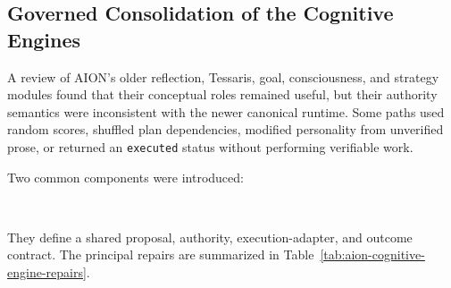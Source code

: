 \subsection{Governed Consolidation of the Cognitive Engines}
\label{subsec:aion-governed-cognitive-consolidation}

A review of AION's older reflection, Tessaris, goal, consciousness, and
strategy modules found that their conceptual roles remained useful, but their
authority semantics were inconsistent with the newer canonical runtime.  Some
paths used random scores, shuffled plan dependencies, modified personality
from unverified prose, or returned an \texttt{executed} status without
performing verifiable work.

Two common components were introduced:
\begin{center}
\small
{}\\
\end{center}
They define a shared proposal, authority, execution-adapter, and outcome
contract.  The principal repairs are summarized in
Table~\ref{tab:aion-cognitive-engine-repairs}.

